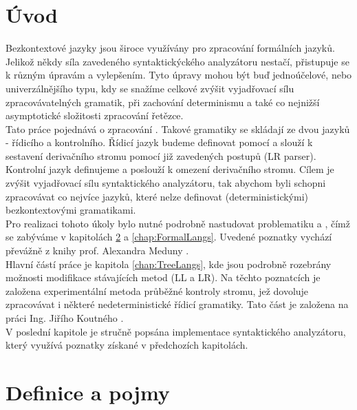 
\chapter{Úvod}

Bezkontextové jazyky jsou široce využívány pro zpracování formálních jazyků.
Jelikož někdy síla zavedeného syntaktickýckého analyzátoru nestačí, přistupuje
se k různým úpravám a vylepšením.
Tyto úpravy mohou být buď jednoúčelové, nebo univerzálnějšího typu, kdy
se snažíme celkové zvýšit vyjadřovací sílu zpracovávatelných gramatik,
při zachování determinismu a také co nejnižší asymptotické složitosti
zpracování řetězce.\\

Tato práce pojednává o zpracování .
Takové gramatiky se skládají ze dvou jazyků - řídicího a kontrolního.
Řídicí jazyk budeme definovat pomocí  a
slouží k sestavení derivačního stromu pomocí již zavedených postupů
(LR parser).
Kontrolní jazyk definujeme  a poslouží k
omezení derivačního stromu. Cílem je zvýšit vyjadřovací sílu
syntaktického analyzátoru, tak abychom byli schopni zpracovávat co
nejvíce jazyků, které nelze definovat (deterministickými) bezkontextovými
gramatikami.\\

Pro realizaci tohoto úkoly bylo nutné podrobně nastudovat problematiku
 a , čímž se zabýváme
v kapitolách \ref{chap:Definitions} a \ref{chap:FormalLangs}. Uvedené
poznatky vychází převážně z knihy prof. Alexandra Meduny \cite{MedunaIFJ}.\\

Hlavní částí práce je kapitola \ref{chap:TreeLangs}, kde jsou podrobně rozebrány
možnosti modifikace stávajících metod (LL a LR). Na těchto poznatcích je
založena experimentální metoda
průběžné kontroly stromu, jež dovoluje zpracovávat i některé nedeterministické
řídicí gramatiky. Tato část je založena na práci Ing. Jiřího Koutného
\cite{Koutny}.\\

V poslední kapitole je stručně popsána implementace syntaktického analyzátoru,
který využívá poznatky získané v předchozích kapitolách.


\chapter{Definice a pojmy}
\label{chap:Definitions}


